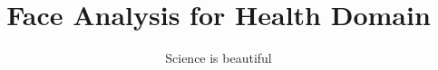 \documentclass[
  doctype=phdplan,          %
  school=unl/fct,       %
  lang=en,              %
  coverlang=pt,         %
  copyrightlang=pt,     %
  fontstyle=kpfonts,    %
  chapstyle=elegant,    %
  otherlistsat=front,   %
  aftercover=false,     %
	linkscolor=darkblue,  %
  printcommittee=true,  %
	spine=false,          %
	biblatex={            %
		style=numeric,      %
		sorting=nyt,        %
		firstinits=true,    %
		sortcites=true,     %
    hyperref=true       %
	},
	memoir={	            %
    a4paper,            %
    11pt,               %
    draft,              %
  },
  media=screen,         %
]{unlthesis}
\title{Face Analysis for Health Domain}
\subtitle{Science is beautiful}
\theoremstyle{definition}
\begin{document}
\thesisfrontmatter	%
\printcoverpage		%
\printaftercover
\printcopyright		%
\printdedicatory	%
\printacknowledgements	%
\printquote		%
\printabstract		%
\tableofcontents* 	%
\printotherlists 	%


\thesismainmatter	%
\printchapthers		%
\printbib		%
\printotherlists 	%
\printappendixes	%
\printbackcoverpage
\end{document}
